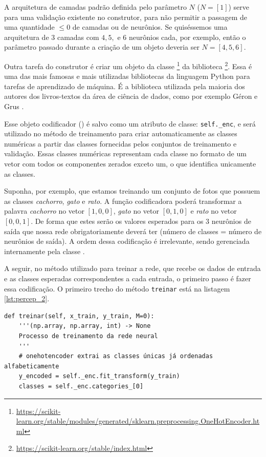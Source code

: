 A arquitetura de camadas padrão definida pelo parâmetro $N$ ($N=[1]$) serve para uma validação existente no construtor, para não permitir a passagem de uma quantidade $\leq 0$ de camadas ou de neurônios. Se quiséssemos uma arquitetura de $3$ camadas com $4, 5, $ e $6$ neurônios cada, por exemplo, então o parâmetro passado durante a criação de um objeto  deveria ser $N = [4, 5, 6]$.

Outra tarefa do construtor é criar um objeto da classe \footnote{\url{https://scikit-learn.org/stable/modules/generated/sklearn.preprocessing.OneHotEncoder.html}} da biblioteca \footnote{\url{https://scikit-learn.org/stable/index.html}}. Essa é uma das mais famosas e mais utilizadas bibliotecas da linguagem Python para tarefas de aprendizado de máquina. É a biblioteca utilizada pela maioria dos autores dos livros-textos da área de ciência de dados, como por exemplo Géron \citep{hands} e Grus \citep{data}.

Esse objeto codificador () é salvo como um atributo de classe: \texttt{self.\_enc}, e será utilizado no método de treinamento para criar automaticamente as classes numéricas a partir das classes fornecidas pelos conjuntos de treinamento e validação. Essas classes numéricas representam cada classe no formato de um vetor com todos os componentes zerados exceto um, o que identifica unicamente as classes.

Suponha, por exemplo, que estamos treinando um conjunto de fotos que possuem as classes \emph{cachorro}, \emph{gato} e \emph{rato}. A função codificadora poderá transformar a palavra \emph{cachorro} no vetor $[1, 0, 0]$, \emph{gato} no vetor $[0, 1, 0]$ e \emph{rato} no vetor $[0, 0, 1]$. De forma que estes serão os valores esperados para os $3$ neurônios de saída que nossa rede obrigatoriamente deverá ter (número de classes = número de neurônios de saída). A ordem dessa codificação é irrelevante, sendo gerenciada internamente pela classe .

A seguir, no método utilizado para treinar a rede, que recebe os dados de entrada e as classes esperadas correspondentes a cada entrada, o primeiro passo é fazer essa codificação. O primeiro trecho do método \texttt{treinar} está na listagem \ref{lst:percep_2}.

\estiloR
\begin{lstlisting}[caption={Trecho da classe \eng{Perceptron}}, label={lst:percep_2}, escapeinside={\%}]
def treinar(self, x_train, y_train, M=0):
    '''(np.array, np.array, int) -> None
    Processo de treinamento da rede neural
    '''
    # onehotencoder extrai as classes únicas já ordenadas alfabeticamente
    y_encoded = self._enc.fit_transform(y_train)
    classes = self._enc.categories_[0]
\end{lstlisting}


